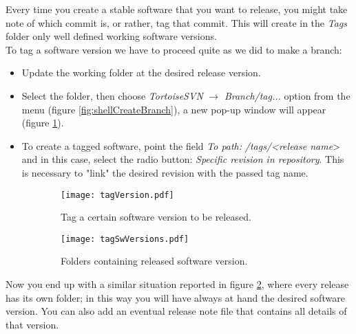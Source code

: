 Every time you create a stable software that you want to release, you might take note of which commit is, or rather, tag that commit. This will create in the \textit{Tags} folder only well defined working software versions.\\

To tag a software version we have to proceed quite as we did to make a branch:

\begin{itemize}

    \item Update the working folder at the desired release version.

    \item Select the folder, then choose \textit{TortoiseSVN} $\rightarrow$ \textit{Branch/tag...} option from the menu (figure \ref{fig:shellCreateBranch}), a new pop-up window will appear (figure \ref{fig:tagVersion}).
    
    \item To create a tagged software, point the field \textit{To path:} \textit{/tags/<release name}> and in this case, select the radio button: \textit{Specific revision in repository}. This is necessary to "link" the desired revision with the passed tag name.
    
\end{itemize}




\begin{figure}[htbp]
\begin{subfigure}{0.5\textwidth}
  \centering
    \texttt{[image: tagVersion.pdf]}
    \caption{Tag a certain software version to be released.}
    \label{fig:tagVersion}
\end{subfigure}%
\begin{subfigure}{0.5\textwidth}
  \centering
    \texttt{[image: tagSwVersions.pdf]}
    \caption{Folders containing released software version.}
    \label{fig:tagSwVersions}
\end{subfigure}%
\caption{}
\label{fig:tagVersionWindows}
\end{figure}


\newpage
Now you end up with a similar situation reported in figure \ref{fig:tagSwVersions}, where every release has its own folder; in this way you will have always at hand the desired software version. You can also add an eventual release note file that contains all details of that version.







